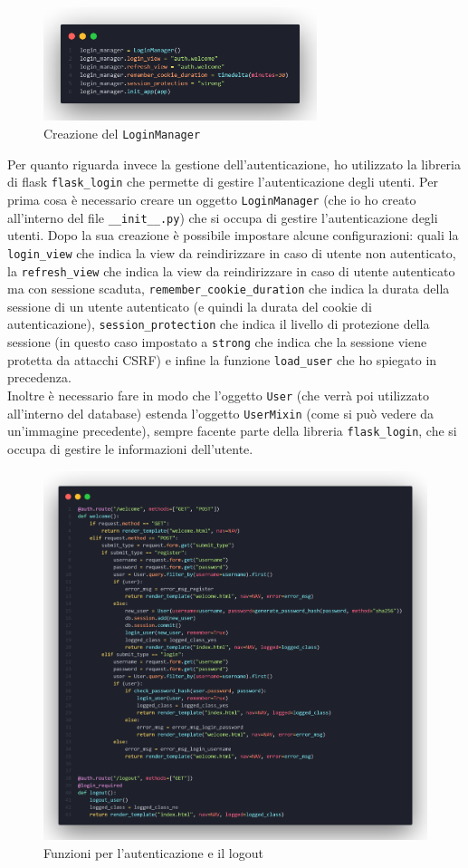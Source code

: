 \documentclass[12pt]{article}
\def\code#1{\texttt{#1}}
\begin{document}
\begin{figure}
    \includegraphics[width=8cm]{login-manager.png}
    \caption{Creazione del \code{LoginManager}}
\end{figure}
\justifying
Per quanto riguarda invece la gestione dell'autenticazione, ho utilizzato la libreria di flask \code{flask\_login} che permette di gestire l'autenticazione degli utenti. Per prima cosa è necessario creare un oggetto \code{LoginManager} (che io ho creato all'interno del file \code{\_\_init\_\_.py}) che si occupa di gestire l'autenticazione degli utenti. Dopo la sua creazione è possibile impostare alcune configurazioni: quali la \code{login\_view} che indica la view da reindirizzare in caso di utente non autenticato, la \code{refresh\_view} che indica la view da reindirizzare in caso di utente autenticato ma con sessione scaduta, \code{remember\_cookie\_duration} che indica la durata della sessione di un utente autenticato (e quindi la durata del cookie di autenticazione), \code{session\_protection} che indica il livello di protezione della sessione (in questo caso impostato a \code{strong} che indica che la sessione viene protetta da attacchi CSRF) e infine la funzione \code{load\_user} che ho spiegato in precedenza. \\
Inoltre è necessario fare in modo che l'oggetto \code{User} (che verrà poi utilizzato all'interno del database) estenda l'oggetto \code{UserMixin} (come si può vedere da un'immagine precedente), sempre facente parte della libreria \code{flask\_login}, che si occupa di gestire le informazioni dell'utente.
\justifying
\begin{figure}[h]
    \centering
    \includegraphics[width=12cm]{auth.png}
    \caption{Funzioni per l'autenticazione e il logout}
\end{figure}
\end{document}
